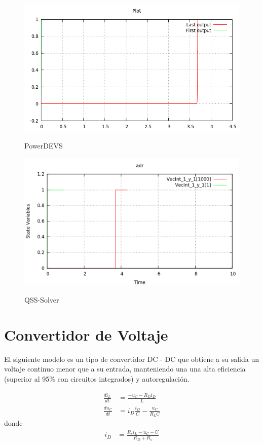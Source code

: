 \begin{figure}[H]
\begin{minipage}{0.5\textwidth}
 \includegraphics[width=\linewidth]{adr-pd}
\label{graph:adr-pd}
\caption{PowerDEVS}
\end{minipage}\hfill
\begin{minipage}{0.5\textwidth}
 \includegraphics[width=\linewidth]{adr-qss}
\label{graph:adr-qss}
\caption{QSS-Solver}
\end{minipage}
\end{figure}

\section{Convertidor de Voltaje}
	El siguiente modelo es un tipo de convertidor DC - DC que obtiene a su  salida  un  voltaje  continuo  menor  que  a  su entrada, manteniendo una una  alta eficiencia (superior al 95\% con circuitos integrados) y autoregulación.

\begin{align*}
\frac{di_{L}}{dt} & = \frac{-u_{C} - R_D i_D }{L}\\
\frac{du_C}{dt} & =i_D \frac{i_D}{C} - \frac{u_C}{R_L C }
\end{align*}
donde
\begin{align*}
i_D & = \frac{R_s i_L - u_C - U }{R_D + R_s}
\end{align*}


